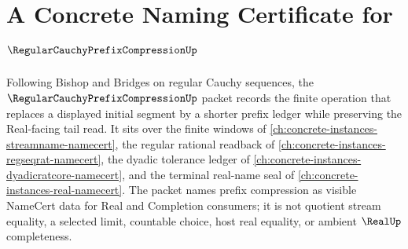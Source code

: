 \chapter{A Concrete Naming Certificate for $\RegularCauchyPrefixCompressionUp$}
\label{ch:concrete-instances-regular-cauchy-prefix-compression-namecert}

Following Bishop and Bridges on regular Cauchy sequences, the $\RegularCauchyPrefixCompressionUp$ packet records the finite operation that replaces a displayed initial segment by a shorter prefix ledger while preserving the Real-facing tail read. It sits over the finite windows of \autoref{ch:concrete-instances-streamname-namecert}, the regular rational readback of \autoref{ch:concrete-instances-regseqrat-namecert}, the dyadic tolerance ledger of \autoref{ch:concrete-instances-dyadicratcore-namecert}, and the terminal real-name seal of \autoref{ch:concrete-instances-real-namecert}. The packet names prefix compression as visible NameCert data for Real and Completion consumers; it is not quotient stream equality, a selected limit, countable choice, host real equality, or ambient $\RealUp$ completeness.


